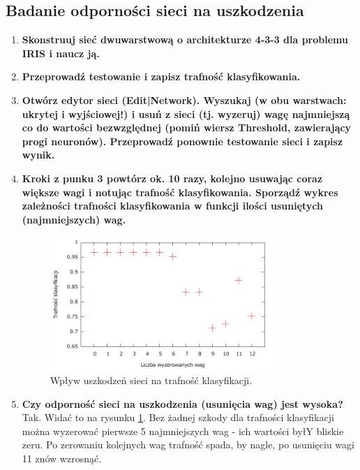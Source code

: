 \subsection{Badanie odporności sieci na uszkodzenia}
\begin{enumerate}
\item \textbf{Skonstruuj sieć dwuwarstwową o architekturze 4-3-3 dla problemu IRIS i naucz ją.}

\item \textbf{
Przeprowadź testowanie i zapisz trafność klasyfikowania.}

\item \textbf{
Otwórz edytor sieci (Edit|Network). Wyszukaj (w obu warstwach: ukrytej i wyjściowej!) i usuń z sieci (tj. wyzeruj) wagę najmniejszą co do wartości bezwzględnej (pomiń wiersz Threshold, zawierający progi neuronów). Przeprowadź ponownie testowanie sieci i zapisz wynik.}

\item \textbf{
Kroki z punku 3 powtórz ok. 10 razy, kolejno usuwając coraz większe wagi i notując trafność klasyfikowania. Sporządź wykres zależności trafności klasyfikowania w funkcji ilości usuniętych (najmniejszych) wag.}
\begin{figure}[h]
\centering
\includegraphics[width=0.8\textwidth]{dane/part1/zad8/damages}
\caption{Wpływ uszkodzeń sieci na trafność klasyfikacji.\label{fig:damages}}
\end{figure}

\item \textbf{
Czy odporność sieci na uszkodzenia (usunięcia wag) jest wysoka?}
\\Tak. Widać to na rysunku \ref{fig:damages}. Bez żadnej szkody dla trafności klasyfikacji można wyzerować pierwsze 5 najmniejszych wag - ich wartości byłY bliskie zeru. Po zerowaniu kolejnych wag trafność spada, by nagle, po usunięciu wagi 11 znów wzrosnąć.


\end{enumerate}
